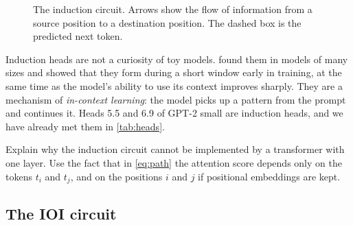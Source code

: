 \begin{figure}[t]
\centering
{}
\caption{The induction circuit. Arrows show the flow of information from a source position to a destination
position. The dashed box is the predicted next token.}
\label{fig:induction}
\end{figure}

Induction heads are not a curiosity of toy models. \citet{olsson2022context} found them in models of many
sizes and showed that they form during a short window early in training, at the same time as the model's
ability to use its context improves sharply. They are a mechanism of \emph{in-context learning}: the model picks
up a pattern from the prompt and continues it. Heads 5.5 and 6.9 of GPT-2 small are induction heads, and we have
already met them in \cref{tab:heads}.

\begin{exercise}\label{ex:induction}
Explain why the induction circuit cannot be implemented by a transformer with one layer. Use the fact that in
\eqref{eq:path} the attention score depends only on the tokens $t_i$ and $t_j$, and on the positions $i$ and $j$
if positional embeddings are kept.
\end{exercise}

\subsection{The IOI circuit}
\label{sec:ioi}

